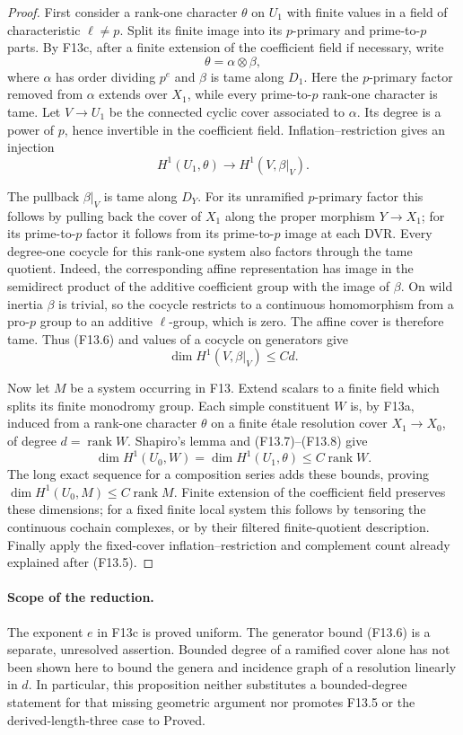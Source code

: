 \begin{proof}
First consider a rank-one character $\theta$ on $U_1$ with finite
values in a field of characteristic $\ell\ne p$. Split its finite
image into its $p$-primary and prime-to-$p$ parts. By F13c, after
a finite extension of the coefficient field if necessary, write
\[
                         \theta=\alpha\otimes\beta,
\]
where $\alpha$ has order dividing $p^e$ and $\beta$ is tame
along $D_1$. Here the $p$-primary factor removed from $\alpha$
extends over $X_1$, while every prime-to-$p$ rank-one character
is tame. Let $V\to U_1$ be the connected cyclic cover associated
to $\alpha$. Its degree is a power of $p$, hence invertible in
the coefficient field. Inflation--restriction gives an injection
\[
                H^1(U_1,\theta)\longrightarrow H^1(V,\beta|_V).
 \tag{F13.7}
\]

The pullback $\beta|_V$ is tame along $D_Y$. For its unramified
$p$-primary factor this follows by pulling back the cover of
$X_1$ along the proper morphism $Y\to X_1$; for its prime-to-$p$
factor it follows from its prime-to-$p$ image at each DVR.
Every degree-one cocycle for this rank-one system also factors
through the tame quotient. Indeed, the corresponding affine
representation has image in the semidirect product of the additive
coefficient group with the image of $\beta$. On wild inertia
$\beta$ is trivial, so the cocycle restricts to a continuous
homomorphism from a pro-$p$ group to an additive $\ell$-group,
which is zero. The affine cover is therefore tame. Thus (F13.6)
and values of a cocycle on generators give
\[
          \dim H^1(V,\beta|_V)\leq Cd.
 \tag{F13.8}
\]

Now let $M$ be a system occurring in F13. Extend scalars to a
finite field which splits its finite monodromy group. Each simple
constituent $W$ is, by F13a, induced from a rank-one character
$\theta$ on a finite \'etale resolution cover $X_1\to X_0$,
of degree $d=\operatorname{rank}W$. Shapiro's lemma and
(F13.7)--(F13.8) give
\[
 \dim H^1(U_0,W)=\dim H^1(U_1,\theta)
                   \leq C\operatorname{rank}W.
\]
The long exact sequence for a composition series adds these
bounds, proving $\dim H^1(U_0,M)\leq C\operatorname{rank}M$.
Finite extension of the coefficient field preserves these
dimensions; for a fixed finite local system this follows by
tensoring the continuous cochain complexes, or by their filtered
finite-quotient description. Finally apply the fixed-cover
inflation--restriction and complement count already explained
after (F13.5).
\end{proof}

\paragraph{Scope of the reduction.}
The exponent $e$ in F13c is proved uniform. The generator bound
(F13.6) is a separate, unresolved assertion. Bounded degree of a
ramified cover alone has not been shown here to bound the genera
and incidence graph of a resolution linearly in $d$. In particular,
this proposition neither substitutes a bounded-degree statement
for that missing geometric argument nor promotes F13.5 or the
derived-length-three case to Proved.
